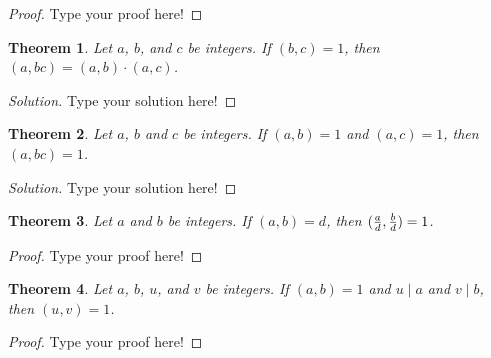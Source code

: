\documentclass[12pt,leqno]{article}
\numberwithin{equation}{section}
\newtheorem{thm}{Theorem}[section]
\theoremstyle{definition}
\begin{document}
\begin{proof}[Proof]
Type your proof here!
\end{proof}


\begin{thm}
Let $a$, $b$, and $c$ be integers.  If $(b, c) = 1$, then $(a, bc) = (a, b) \cdot (a, c)$.
\end{thm}

\begin{proof}[Solution]
Type your solution here!
\end{proof}


\begin{thm}
Let $a$, $b$ and $c$ be integers.  If $(a, b) = 1$ and $(a, c) = 1$, then \\$(a, bc) = 1$.
\end{thm}

\begin{proof}[Solution]
Type your solution here!
\end{proof}


\begin{thm}
Let $a$ and $b$ be integers.  If $(a, b) = d$, then $({a \over d}, {b \over d}) = 1$. 
\end{thm}

\begin{proof}[Proof]
Type your proof here!
\end{proof}


\begin{thm}
Let $a$, $b$, $u$, and $v$ be integers.  If $(a, b) = 1$ and $u \mid a$ and $v \mid b$, then $(u, v) = 1$.
\end{thm}

\begin{proof}[Proof]
Type your proof here!
\end{proof}
\end{document}
